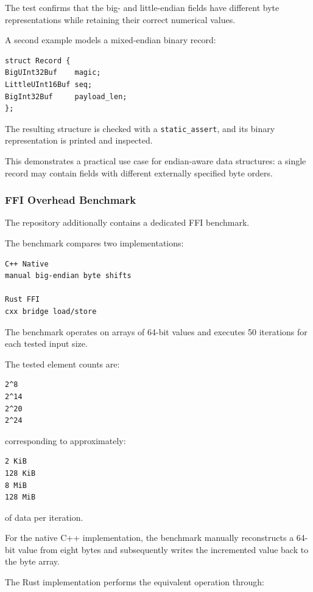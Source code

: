 The test confirms that the big- and little-endian fields have different byte representations while retaining their correct numerical values.

A second example models a mixed-endian binary record:

\begin{lstlisting}[style=cppblock]
struct Record {
BigUInt32Buf    magic;
LittleUInt16Buf seq;
BigInt32Buf     payload_len;
};
\end{lstlisting}

The resulting structure is checked with a \texttt{static\_assert}, and its binary representation is printed and inspected.

This demonstrates a practical use case for endian-aware data structures: a single record may contain fields with different externally 
specified byte orders.

\subsubsection{FFI Overhead Benchmark}

The repository additionally contains a dedicated FFI benchmark.

The benchmark compares two implementations:

\begin{lstlisting}[style=textblock]
C++ Native
manual big-endian byte shifts

Rust FFI
cxx bridge load/store
\end{lstlisting}

The benchmark operates on arrays of 64-bit values and executes 50 iterations for each tested input size.

The tested element counts are:

\begin{lstlisting}[style=textblock]
2^8
2^14
2^20
2^24
\end{lstlisting}

corresponding to approximately:

\begin{lstlisting}[style=textblock]
2 KiB
128 KiB
8 MiB
128 MiB
\end{lstlisting}

of data per iteration.

For the native C++ implementation, the benchmark manually reconstructs a 64-bit value from eight bytes and subsequently writes the 
incremented value back to the byte array.

The Rust implementation performs the equivalent operation through:

